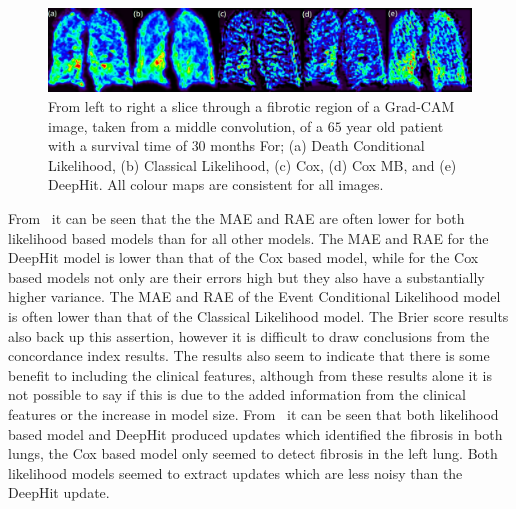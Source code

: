         \begin{figure}\centering
    
            \includegraphics[width=1.0\linewidth]{figures/survival_analysis_grad_cam_label.png}
            
            \captionsetup{singlelinecheck=false, justification=centering}
            \caption{
                From left to right a slice through a fibrotic region of a Grad-CAM image, taken from a middle convolution, of a $65$ year old patient with a survival time of $30$ months For; (a) Death Conditional Likelihood, (b) Classical Likelihood, (c) Cox, (d) Cox \gls{MB}, and (e) DeepHit. All colour maps are consistent for all images.
            }
            \label{fig:deep_learning_for_ct_based_survival_analysis_of_idiopathic_pulmonary_fibrosis_patients_appendix_results_grad_cam}
       \end{figure}
    
        From~ it can be seen that the the \gls{MAE} and \gls{RAE} are often lower for both likelihood based models than for all other models. The \gls{MAE} and \gls{RAE} for the DeepHit model is lower than that of the Cox based model, while for the Cox based models not only are their errors high but they also have a substantially higher variance. The \gls{MAE} and \gls{RAE} of the Event Conditional Likelihood model is often lower than that of the Classical Likelihood model. The Brier score results also back up this assertion, however it is difficult to draw conclusions from the concordance index results. The results also seem to indicate that there is some benefit to including the clinical features, although from these results alone it is not possible to say if this is due to the added information from the clinical features or the increase in model size. From~ it can be seen that both likelihood based model and DeepHit produced updates which identified the fibrosis in both lungs, the Cox based model only seemed to detect fibrosis in the left lung. Both likelihood models seemed to extract updates which are less noisy than the DeepHit update.
    
